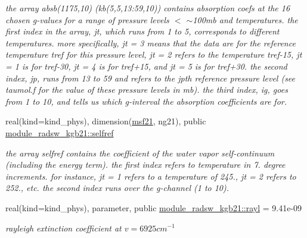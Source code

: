 \begin{DoxyCompactItemize}
\begin{DoxyCompactList}\small\item\em the array absb(1175,10) (kb(5,5,13\+:59,10)) contains absorption coefs at the 16 chosen g-\/values for a range of pressure levels $<$ $\sim$100mb and temperatures. the first index in the array, jt, which runs from 1 to 5, corresponds to different temperatures. more specifically, jt = 3 means that the data are for the reference temperature tref for this pressure level, jt = 2 refers to the temperature tref-\/15, jt = 1 is for tref-\/30, jt = 4 is for tref+15, and jt = 5 is for tref+30. the second index, jp, runs from 13 to 59 and refers to the jpth reference pressure level (see taumol.\+f for the value of these pressure levels in mb). the third index, ig, goes from 1 to 10, and tells us which g-\/interval the absorption coefficients are for. \end{DoxyCompactList}\item 
\mbox{\label{group__module__radsw__kgbnn_ga76fc3e4566fcee982b99b10ea562ba93}} 
real(kind=kind\+\_\+phys), dimension(\hyperlink{group__module__radsw__kgbnn_gae70b5abfa847419cbf189d2502c34ddd}{msf21}, ng21), public \hyperlink{group__module__radsw__kgbnn_ga76fc3e4566fcee982b99b10ea562ba93}{module\+\_\+radsw\+\_\+kgb21\+::selfref}
\begin{DoxyCompactList}\small\item\em the array selfref contains the coefficient of the water vapor self-\/continuum (including the energy term). the first index refers to temperature in 7. degree increments. for instance, jt = 1 refers to a temperature of 245., jt = 2 refers to 252., etc. the second index runs over the g-\/channel (1 to 10). \end{DoxyCompactList}\item 
\mbox{\label{group__module__radsw__kgbnn_ga8df418599fb8aef5fc8f2935a913b361}} 
real(kind=kind\+\_\+phys), parameter, public \hyperlink{group__module__radsw__kgbnn_ga8df418599fb8aef5fc8f2935a913b361}{module\+\_\+radsw\+\_\+kgb21\+::rayl} = 9.\+41e-\/09
\begin{DoxyCompactList}\small\item\em rayleigh extinction coefficient at $v=6925cm^{-1}$ \end{DoxyCompactList}\item 
\mbox{\label{group__module__radsw__kgbnn_ga3398f8d12ec0349b44197873ac58fd98}} 

\end{DoxyCompactItemize}
